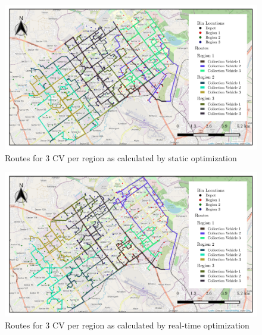 \documentclass[12pt]{article}
\begin{document}
\begin{figure}[H]
    \centering
    \includegraphics[scale=1.4]{Static_Weighted_3_Truck.png} %
    \caption{Routes for 3 CV per region as calculated by static optimization}\label{fig4}
\end{figure}
\begin{figure}[H]
    \centering
    \includegraphics[scale=1.4]{Dynamic_weighted_3_Truck.png} %
    \caption{Routes for 3 CV per region as calculated by real-time optimization}\label{fig5}
\end{figure}
\end{document}

